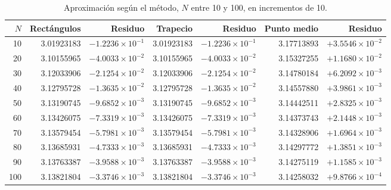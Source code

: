 \begin{table}[H]
\centering
\caption{Aproximación según el método, \(N\) entre 10 y 100, en incrementos de 10.}
\label{tab:e3_10a100}
\footnotesize
\setlength{\tabcolsep}{3pt}
\begin{tabular}{r r r r r r r}
\toprule
\(N\) & Rectángulos & Residuo & Trapecio & Residuo & Punto medio & Residuo \\
\midrule
10    & 3.01923183 & \(-1.2236\times10^{-1}\) & 3.01923183 & \(-1.2236\times10^{-1}\) & 3.17713893 & \(+3.5546\times10^{-2}\) \\
20    & 3.10155965 & \(-4.0033\times10^{-2}\) & 3.10155965 & \(-4.0033\times10^{-2}\) & 3.15327255 & \(+1.1680\times10^{-2}\) \\
30    & 3.12033906 & \(-2.1254\times10^{-2}\) & 3.12033906 & \(-2.1254\times10^{-2}\) & 3.14780184 & \(+6.2092\times10^{-3}\) \\
40    & 3.12795728 & \(-1.3635\times10^{-2}\) & 3.12795728 & \(-1.3635\times10^{-2}\) & 3.14557880 & \(+3.9861\times10^{-3}\) \\
50    & 3.13190745 & \(-9.6852\times10^{-3}\) & 3.13190745 & \(-9.6852\times10^{-3}\) & 3.14442511 & \(+2.8325\times10^{-3}\) \\
60    & 3.13426075 & \(-7.3319\times10^{-3}\) & 3.13426075 & \(-7.3319\times10^{-3}\) & 3.14373743 & \(+2.1448\times10^{-3}\) \\
70    & 3.13579454 & \(-5.7981\times10^{-3}\) & 3.13579454 & \(-5.7981\times10^{-3}\) & 3.14328906 & \(+1.6964\times10^{-3}\) \\
80    & 3.13685931 & \(-4.7333\times10^{-3}\) & 3.13685931 & \(-4.7333\times10^{-3}\) & 3.14297772 & \(+1.3851\times10^{-3}\) \\
90    & 3.13763387 & \(-3.9588\times10^{-3}\) & 3.13763387 & \(-3.9588\times10^{-3}\) & 3.14275119 & \(+1.1585\times10^{-3}\) \\
100   & 3.13821804 & \(-3.3746\times10^{-3}\) & 3.13821804 & \(-3.3746\times10^{-3}\) & 3.14258032 & \(+9.8766\times10^{-4}\) \\
\bottomrule
\end{tabular}
\end{table}


